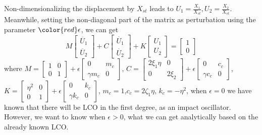 \documentclass{article}
\begin{document}
	Non-dimensionalizing the displacement by $X_{st}$ leads to $U_1=\frac{X_1}{X_{st}},U_2=\frac{X_2}{X_{st}}$. Meanwhile, setting the non-diagonal part of the matrix as perturbation using the parameter $\color{red} \epsilon$, we can get
	\begin{equation}
	M
	\begin{bmatrix}
	\ddot{U_1}\\\ddot{U_2}
	\end{bmatrix}+ C \begin{bmatrix}
	\dot{U_1}\\\dot{U_2}
	\end{bmatrix}+K\begin{bmatrix}
	U_1\\U_2
	\end{bmatrix}=\begin{bmatrix}
	1 \\0
	\end{bmatrix}
	\label{eq:coupling pertubed equation}
	\end{equation}
	where $M=\begin{bmatrix}
	1&0\\0&1
	\end{bmatrix}+\epsilon \begin{bmatrix}
	0& m_c\\ \gamma m_c & 0
	\end{bmatrix}$,
	$C=\begin{bmatrix}
	2 \xi_1 \eta &0\\0&2  \xi_2
	\end{bmatrix}+\epsilon \begin{bmatrix}
	0& c_c\\ \gamma c_c & 0
	\end{bmatrix}$,
	$K=\begin{bmatrix}
	\eta^2&0\\0 & 1
	\end{bmatrix}+\epsilon \begin{bmatrix}
	0&k_c\\ \gamma k_c& 0
	\end{bmatrix}$, $m_c = 1$,$c_c = 2 \zeta_1 \eta$, $k_c = -\eta^2$, 
	when $\epsilon = 0$ we have known that there will be LCO in the first degree, as an impact oscillator. However, we want to know when $\epsilon > 0$, what we can get analytically  based on the already known LCO.
	
\end{document}

